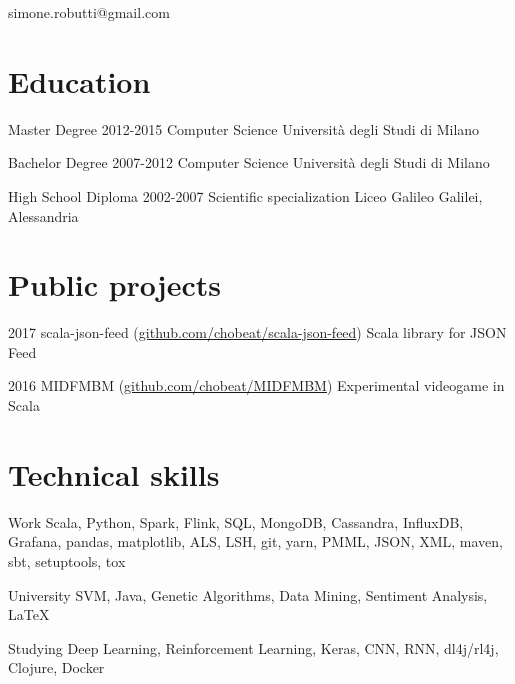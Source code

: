 \documentclass{tccv}
\begin{document}
    {simone.robutti@gmail.com}

\section{Education}

\begin{yearlist}

\item[Master Degree]{2012-2015}
     {Computer Science}
     {Università degli Studi di Milano}

\item[Bachelor Degree]{2007-2012}
{Computer Science}
{Università degli Studi di Milano}

\item[High School Diploma]{2002-2007}
{Scientific specialization}
{Liceo Galileo Galilei, Alessandria}



\end{yearlist}

\section{Public projects}

\begin{yearlist}

\item{2017}
     {scala-json-feed (\href{https://github.com/chobeat/scala-json-feed}{github.com/chobeat/scala-json-feed})}
     {Scala library for JSON Feed}

\item{2016}
     {MIDFMBM (\href{https://github.com/chobeat/MIDFMBM}{github.com/chobeat/MIDFMBM})}
     {Experimental videogame in Scala}

\end{yearlist}

\section{Technical skills}

\begin{factlist}

\item{Work}
     {Scala, Python, Spark, Flink, SQL, MongoDB, Cassandra, InfluxDB, Grafana, pandas, matplotlib, ALS, LSH, git, yarn, PMML, JSON, XML, maven, sbt, setuptools, tox}

\item{University}
{SVM, Java, Genetic Algorithms, Data Mining, Sentiment Analysis, \LaTeX}

\item{Studying}
     {Deep Learning, Reinforcement Learning, Keras, CNN, RNN, dl4j/rl4j, Clojure, Docker}


\end{factlist}
\end{document}
